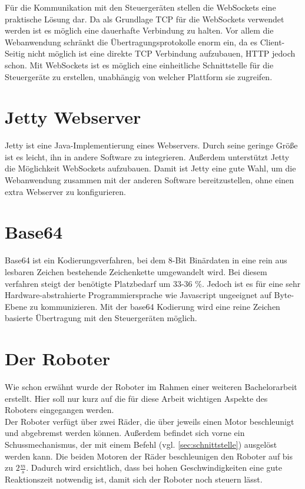 Für die Kommunikation mit den Steuergeräten stellen die WebSockets eine praktische Lösung dar. Da als Grundlage TCP für die WebSockets verwendet werden ist es möglich eine dauerhafte Verbindung zu halten. Vor allem die Webanwendung schränkt die Übertragungsprotokolle enorm ein, da es Client-Seitig nicht möglich ist eine direkte TCP Verbindung aufzubauen, HTTP jedoch schon. Mit WebSockets ist es möglich eine einheitliche Schnittstelle für die Steuergeräte zu erstellen, unabhängig von welcher Plattform sie zugreifen.



\section{Jetty Webserver}
Jetty \cite{JETTY} ist eine Java-Implementierung eines Webservers. Durch seine geringe Größe ist es leicht, ihn in andere Software zu integrieren. Außerdem unterstützt Jetty die Möglichkeit WebSockets aufzubauen. Damit ist Jetty eine gute Wahl, um die Webanwendung zusammen mit der anderen Software bereitzustellen, ohne einen extra Webserver zu konfigurieren.



\section{Base64}
Base64 ist ein Kodierungsverfahren, bei dem 8-Bit Binärdaten in eine rein aus lesbaren Zeichen bestehende Zeichenkette umgewandelt wird. Bei diesem verfahren steigt der benötigte Platzbedarf um 33-36 \%. Jedoch ist es für eine sehr Hardware-abstrahierte Programmiersprache wie Javascript ungeeignet auf Byte-Ebene zu kommunizieren. Mit der base64 Kodierung wird eine reine Zeichen basierte Übertragung mit den Steuergeräten möglich.

\section{Der Roboter}
Wie schon erwähnt wurde der Roboter im Rahmen einer weiteren Bachelorarbeit erstellt. Hier soll nur kurz auf die für diese Arbeit wichtigen Aspekte des Roboters eingegangen werden. \\
Der Roboter verfügt über zwei Räder, die über jeweils einen Motor beschleunigt und abgebremst werden können. Außerdem befindet sich vorne ein Schussmechanismus, der mit einem Befehl (vgl. \ref{sec:schnittstelle}) ausgelöst werden kann. Die beiden Motoren der Räder beschleunigen den Roboter auf bis zu $2\frac{m}{s}$. Dadurch wird ersichtlich, dass bei hohen Geschwindigkeiten eine gute Reaktionszeit notwendig ist, damit sich der Roboter noch steuern lässt.